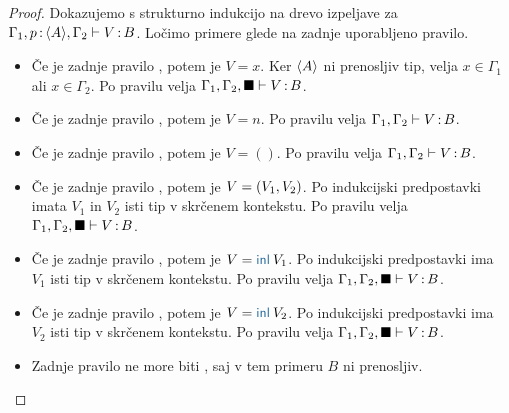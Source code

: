 \begin{proof}
	Dokazujemo s strukturno indukcijo na drevo izpeljave za $\Gamma_1, p \mathinner{:} \langle A \rangle, \Gamma_2 \vdash V \mathinner{:} B$.
	Ločimo primere glede na zadnje uporabljeno pravilo.
	
	\begin{itemize}
		\item[\sitem] Če je zadnje pravilo , potem je $V = x$. Ker $\langle A \rangle$ ni prenosljiv tip, velja $x \in \Gamma_1$ ali $x \in \Gamma_2$.
		Po pravilu  velja $\Gamma_1, \Gamma_2, \blacksquare \vdash V \mathinner{:} B$.
		
		\item Če je zadnje pravilo , potem je $V = n$. Po pravilu  velja $\Gamma_1, \Gamma_2 \vdash V \mathinner{:} B$.

		\item Če je zadnje pravilo , potem je $V = ()$. Po pravilu  velja $\Gamma_1, \Gamma_2 \vdash V \mathinner{:} B$.
		
		\item Če je zadnje pravilo , potem je $V =( V_1 , V_2 )$.
		Po indukcijski predpostavki imata $V_1$ in $V_2$ isti tip v skrčenem kontekstu.
		Po pravilu  velja $\Gamma_1, \Gamma_2, \blacksquare \vdash V \mathinner{:} B$.
		
		\item Če je zadnje pravilo , potem je $V = \tminl{V_1}$.
		Po indukcijski predpostavki ima $V_1$ isti tip v skrčenem kontekstu.
		Po pravilu  velja $\Gamma_1, \Gamma_2, \blacksquare \vdash V \mathinner{:} B$.
		
		\item Če je zadnje pravilo , potem je $V = \tminl{V_2}$.
		Po indukcijski predpostavki ima $V_2$ isti tip v skrčenem kontekstu.
		Po pravilu  velja $\Gamma_1, \Gamma_2, \blacksquare \vdash V \mathinner{:} B$.
		
		\item Zadnje pravilo ne more biti , saj v tem primeru $B$ ni prenosljiv.
		

\end{itemize}
\end{proof}
